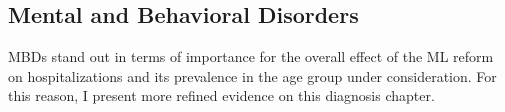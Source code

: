 \bigskip
\subsection{Mental and Behavioral Disorders}
MBDs stand out in terms of importance for the overall effect of the ML reform on hospitalizations and its prevalence in the age group under consideration. For this reason, I present more refined evidence on this diagnosis chapter. %

